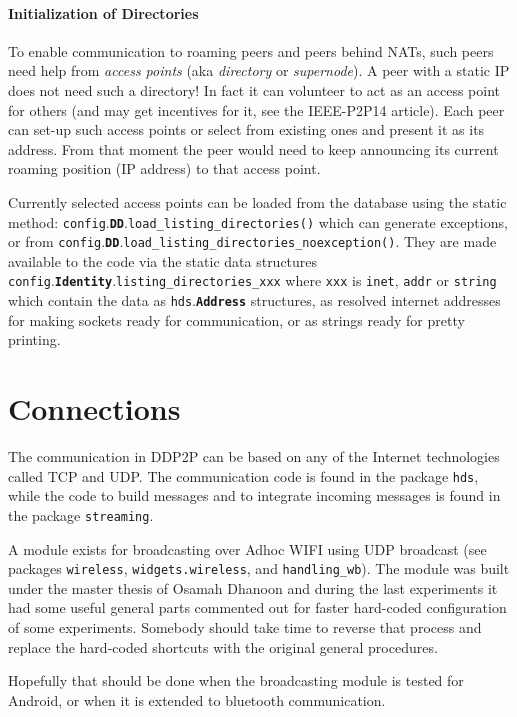 \documentclass{book}
\newcommand{\pkg}[1]{{\tt #1}}
\newcommand{\cls}[1]{{\tt\bf #1}}
\newcommand{\mth}[1]{{\tt #1}}
\newcommand{\mmb}[1]{{\tt #1}}
\begin{document}
\paragraph{Initialization of Directories}
To enable communication to roaming peers and peers behind NATs, such peers need help from {\em access points} (aka {\em directory} or {\em supernode}).
A peer with a static IP does not need such a directory! In fact it can volunteer to act as an access point for others
(and may get incentives for it, see the IEEE-P2P14 article).
Each peer can set-up such access points or select from existing ones and present it as its address.
From that moment the peer would need to keep announcing its current roaming position (IP address) to that access point.

Currently selected access points can be loaded from the database using the static method:
\pkg{config}.\cls{DD}.\mth{load\_listing\_directories()} which can generate exceptions, or from
\pkg{config}.\cls{DD}.\mth{load\_listing\_directories\_noexception()}. They are made available to
the code via the static data structures \pkg{config}.\cls{Identity}.\mmb{listing\_directories\_xxx} where \mmb{xxx} is \mmb{inet}, \mmb{addr} or \mmb{string} which contain the data
as \pkg{hds}.\cls{Address} structures, as resolved internet addresses for making sockets ready for communication, or as strings ready for pretty printing.

\section{Connections}
The communication in DDP2P can be based on any of the Internet technologies called TCP and UDP. The communication code is found in the package \pkg{hds}, while
the code to build messages and to integrate incoming  messages is found in the package \pkg{streaming}.

A module exists for broadcasting over Adhoc WIFI using UDP broadcast (see packages \pkg{wireless}, \pkg{widgets.wireless}, and \pkg{handling\_wb}).
The module was built under the master thesis of Osamah Dhanoon and during the last experiments it had some useful
general parts commented
out for faster hard-coded configuration of some experiments. Somebody should take time to reverse that process and replace the
hard-coded shortcuts with the original general procedures.

Hopefully that should be done when the broadcasting module is tested for Android, or when it is extended to bluetooth communication.
\end{document}

